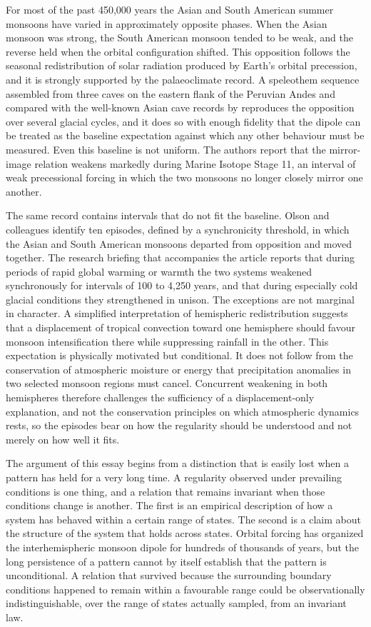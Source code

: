 \documentclass[11pt]{article}
\theoremstyle{definition}
\begin{document}
For most of the past 450,000 years the Asian and South American summer monsoons have varied in approximately opposite phases. When the Asian monsoon was strong, the South American monsoon tended to be weak, and the reverse held when the orbital configuration shifted. This opposition follows the seasonal redistribution of solar radiation produced by Earth's orbital precession, and it is strongly supported by the palaeoclimate record. A speleothem sequence assembled from three caves on the eastern flank of the Peruvian Andes and compared with the well-known Asian cave records by \citet{olson2026} reproduces the opposition over several glacial cycles, and it does so with enough fidelity that the dipole can be treated as the baseline expectation against which any other behaviour must be measured. Even this baseline is not uniform. The authors report that the mirror-image relation weakens markedly during Marine Isotope Stage 11, an interval of weak precessional forcing in which the two monsoons no longer closely mirror one another.

The same record contains intervals that do not fit the baseline. Olson and colleagues identify ten episodes, defined by a synchronicity threshold, in which the Asian and South American monsoons departed from opposition and moved together. The research briefing that accompanies the article reports that during periods of rapid global warming or warmth the two systems weakened synchronously for intervals of 100 to 4,250 years, and that during especially cold glacial conditions they strengthened in unison. The exceptions are not marginal in character. A simplified interpretation of hemispheric redistribution suggests that a displacement of tropical convection toward one hemisphere should favour monsoon intensification there while suppressing rainfall in the other. This expectation is physically motivated but conditional. It does not follow from the conservation of atmospheric moisture or energy that precipitation anomalies in two selected monsoon regions must cancel. Concurrent weakening in both hemispheres therefore challenges the sufficiency of a displacement-only explanation, and not the conservation principles on which atmospheric dynamics rests, so the episodes bear on how the regularity should be understood and not merely on how well it fits.

The argument of this essay begins from a distinction that is easily lost when a pattern has held for a very long time. A regularity observed under prevailing conditions is one thing, and a relation that remains invariant when those conditions change is another. The first is an empirical description of how a system has behaved within a certain range of states. The second is a claim about the structure of the system that holds across states. Orbital forcing has organized the interhemispheric monsoon dipole for hundreds of thousands of years, but the long persistence of a pattern cannot by itself establish that the pattern is unconditional. A relation that survived because the surrounding boundary conditions happened to remain within a favourable range could be observationally indistinguishable, over the range of states actually sampled, from an invariant law.
\end{document}
